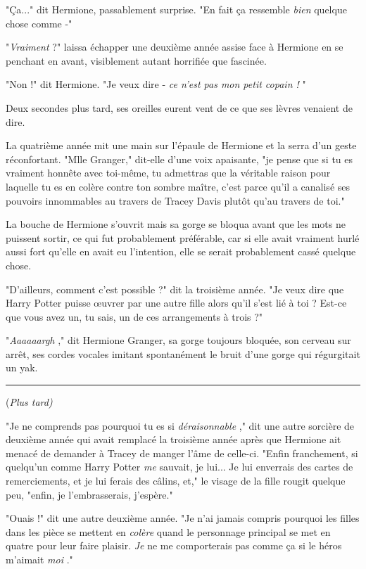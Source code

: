 "Ça..." dit Hermione, passablement surprise. "En fait ça ressemble \emph{bien } quelque chose comme -"

"\emph{Vraiment}  ?" laissa échapper une deuxième année assise face à Hermione en se penchant en avant, visiblement autant horrifiée que fascinée.

"Non !" dit Hermione. "Je veux dire - \emph{ce n'est pas mon petit copain !} "

Deux secondes plus tard, ses oreilles eurent vent de ce que ses lèvres venaient de dire.

La quatrième année mit une main sur l'épaule de Hermione et la serra d'un geste réconfortant. "Mlle Granger," dit-elle d'une voix apaisante, "je pense que si tu es vraiment honnête avec toi-même, tu admettras que la véritable raison pour laquelle tu es en colère contre ton sombre maître, c'est parce qu'il a canalisé ses pouvoirs innommables au travers de Tracey Davis plutôt qu'au travers de toi."

La bouche de Hermione s'ouvrit mais sa gorge se bloqua avant que les mots ne puissent sortir, ce qui fut probablement préférable, car si elle avait vraiment hurlé aussi fort qu'elle en avait eu l'intention, elle se serait probablement cassé quelque chose.

"D'ailleurs, comment c'est possible ?" dit la troisième année. "Je veux dire que Harry Potter puisse œuvrer par une autre fille alors qu'il s'est lié à toi ? Est-ce que vous avez un, tu sais, un de ces arrangements à trois ?"

"\emph{Aaaaaargh} ," dit Hermione Granger, sa gorge toujours bloquée, son cerveau sur arrêt, ses cordes vocales imitant spontanément le bruit d'une gorge qui régurgitait un yak.
\par\noindent\rule{\textwidth}{0.4pt}
(\emph{Plus tard)} 

"Je ne comprends pas pourquoi tu es si \emph{déraisonnable} ," dit une autre sorcière de deuxième année qui avait remplacé la troisième année après que Hermione ait menacé de demander à Tracey de manger l'âme de celle-ci. "Enfin franchement, si quelqu'un comme Harry Potter \emph{me}  sauvait, je lui... Je lui enverrais des cartes de remerciements, et je lui ferais des câlins, et," le visage de la fille rougit quelque peu, "enfin, je l'embrasserais, j'espère."

"Ouais !" dit une autre deuxième année. "Je n'ai jamais compris pourquoi les filles dans les pièce se mettent en \emph{colère}  quand le personnage principal se met en quatre pour leur faire plaisir. \emph{Je}  ne me comporterais pas comme ça si le héros m'aimait \emph{moi} ."


